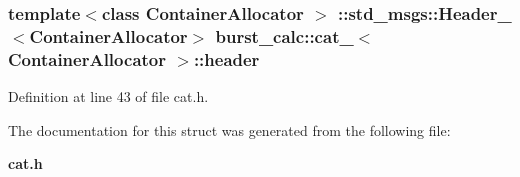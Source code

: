 \subsubsection[{header}]{\setlength{\rightskip}{0pt plus 5cm}template$<$class Container\-Allocator $>$ \-::std\-\_\-msgs\-::\-Header\-\_\-$<$\-Container\-Allocator$>$ {\bf burst\-\_\-calc\-::cat\-\_\-}$<$ \-Container\-Allocator $>$\-::{\bf header}}\label{structburst__calc_1_1cat___a7cd0e13c2684ef1485658be0abb46bb5}


\-Definition at line 43 of file cat.\-h.



\-The documentation for this struct was generated from the following file\-:\begin{DoxyCompactItemize}
\item 
{\bf cat.\-h}\end{DoxyCompactItemize}
